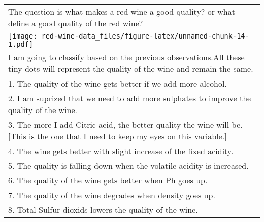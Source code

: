 \documentclass[]{article}
\begin{document}
\begin{longtable}[]{@{}l@{}}
\begin{minipage}[t]{0.47\columnwidth}
The question is what makes a red wine a good quality? or what define a
good quality of the red wine?\strut
\end{minipage}\tabularnewline
\begin{minipage}[t]{0.47\columnwidth}\raggedright\strut
\texttt{[image: red-wine-data\_files/figure-latex/unnamed-chunk-14-1.pdf]}\strut
\end{minipage}\tabularnewline
\begin{minipage}[t]{0.47\columnwidth}\raggedright\strut
I am going to classify based on the previous observations.All these tiny
dots will represent the quality of the wine and remain the same.\strut
\end{minipage}\tabularnewline
\begin{minipage}[t]{0.47\columnwidth}\raggedright\strut
1. The quality of the wine gets better if we add more alcohol.\strut
\end{minipage}\tabularnewline
\begin{minipage}[t]{0.47\columnwidth}\raggedright\strut
2. I am suprized that we need to add more sulphates to improve the
quality of the wine.\strut
\end{minipage}\tabularnewline
\begin{minipage}[t]{0.47\columnwidth}\raggedright\strut
3. The more I add Citric acid, the better quality the wine will
be.{[}This is the one that I need to keep my eyes on this
variable.{]}\strut
\end{minipage}\tabularnewline
\begin{minipage}[t]{0.47\columnwidth}\raggedright\strut
4. The wine gets better with slight increase of the fixed acidity.\strut
\end{minipage}\tabularnewline
\begin{minipage}[t]{0.47\columnwidth}\raggedright\strut
5. The quality is falling down when the volatile acidity is
increased.\strut
\end{minipage}\tabularnewline
\begin{minipage}[t]{0.47\columnwidth}\raggedright\strut
6. The quality of the wine gets better when Ph goes up.\strut
\end{minipage}\tabularnewline
\begin{minipage}[t]{0.47\columnwidth}\raggedright\strut
7. The quality of the wine degrades when density goes up.\strut
\end{minipage}\tabularnewline
\begin{minipage}[t]{0.47\columnwidth}\raggedright\strut
8. Total Sulfur dioxids lowers the quality of the wine.\strut

\end{minipage}
\end{longtable}
\end{document}

